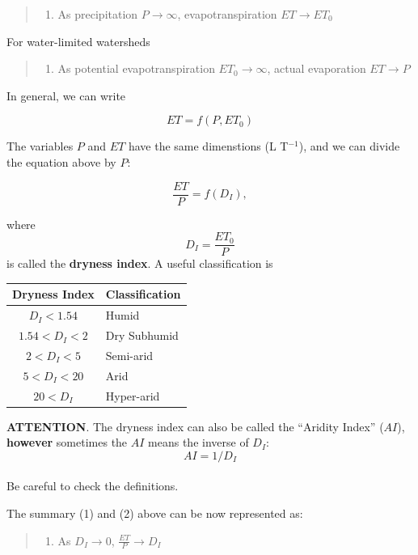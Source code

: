 \documentclass[
  letterpaper,
  DIV=11,
  numbers=noendperiod]{scrreprt}
\providecommand{\tightlist}{%
  \setlength{\itemsep}{0pt}\setlength{\parskip}{0pt}}\usepackage{longtable,booktabs,array}
\begin{document}
\begin{quote}
\begin{enumerate}
\def\labelenumi{(\arabic{enumi})}
\tightlist
\item
  As precipitation \(P\rightarrow \infty\), evapotranspiration
  \(ET\rightarrow ET_0\)
\end{enumerate}
\end{quote}

For water-limited watersheds

\begin{quote}
\begin{enumerate}
\def\labelenumi{(\arabic{enumi})}
\setcounter{enumi}{1}
\tightlist
\item
  As potential evapotranspiration \(ET_0\rightarrow \infty\), actual
  evaporation \(ET\rightarrow P\)
\end{enumerate}
\end{quote}

In general, we can write

\[
ET = f(P,ET_0)
\]

The variables \(P\) and \(ET\) have the same dimenstions (L T\(^{-1}\)),
and we can divide the equation above by \(P\):

\[
\frac{ET}{P} = f(D_I),
\]

where \[
D_I = \displaystyle\frac{ET_0}{P}
\] is called the \textbf{dryness index}. A useful classification is

\begin{longtable}[]{@{}cl@{}}
\toprule()
Dryness Index & Classification \\
\midrule()
\endhead
\(D_I < 1.54\) & Humid \\
\(1.54 < D_I < 2\) & Dry Subhumid \\
\(2 < D_I < 5\) & Semi-arid \\
\(5 < D_I < 20\) & Arid \\
\(20 < D_I\) & Hyper-arid \\
\bottomrule()
\end{longtable}

\textbf{ATTENTION}. The dryness index can also be called the ``Aridity
Index'' (\(AI\)), \textbf{however} sometimes the \(AI\) means the
inverse of \(D_I\):\\
\[AI = 1/D_I\]\\
Be careful to check the definitions.

The summary (1) and (2) above can be now represented as:

\begin{quote}
\begin{enumerate}
\def\labelenumi{(\arabic{enumi})}
\tightlist
\item
  As \(D_I\rightarrow 0\), \(\displaystyle\frac{ET}{P}\rightarrow D_I\)
\end{enumerate}
\end{quote}
\end{document}
